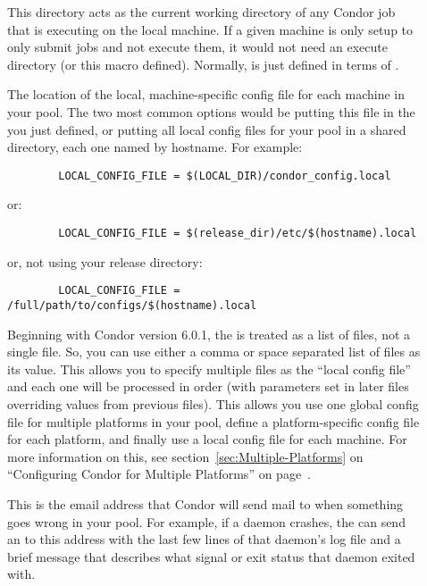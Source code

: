 \begin{description}
\item[] \label{param:Execute} This directory acts as
  the current working directory of any Condor job that is executing on
  the local machine.  If a given machine is only setup to only submit
  jobs and not execute them, it would not need an execute directory
  (or this macro defined).  Normally,  is just defined
  in terms of .
  
\item[] \label{param:LocalConfigFile} The
  location of the local, machine-specific config file for each machine
  in your pool.  The two most common options would be putting this
  file in the  you just defined, or putting all
  local config files for your pool in a shared directory, each one
  named by hostname.  For example:
\begin{verbatim}
        LOCAL_CONFIG_FILE = $(LOCAL_DIR)/condor_config.local
\end{verbatim}
  or:
\begin{verbatim}
        LOCAL_CONFIG_FILE = $(release_dir)/etc/$(hostname).local
\end{verbatim}
  or, not using your release directory:
\begin{verbatim}
        LOCAL_CONFIG_FILE = /full/path/to/configs/$(hostname).local
\end{verbatim}
  
  Beginning with Condor version 6.0.1, the 
  is treated as a list of files, not a single file.  So, you can use
  either a comma or space separated list of files as its value.  This
  allows you to specify multiple files as the ``local config file''
  and each one will be processed in order (with parameters set in
  later files overriding values from previous files).  This allows
  you use one global config file for multiple platforms in your pool,
  define a platform-specific config file for each platform, and
  finally use a local config file for each machine.  For more
  information on this, see section~\ref{sec:Multiple-Platforms} on
  ``Configuring Condor for Multiple Platforms'' on
  page~\pageref{sec:Multiple-Platforms}.

\item[] \label{param:CondorAdmin} This is the email
  address that Condor will send mail to when something goes wrong in
  your pool.  For example, if a daemon crashes, the 
  can send an  to this address with the last few lines
  of that daemon's log file and a brief message that describes what
  signal or exit status that daemon exited with.
  

\end{description}
